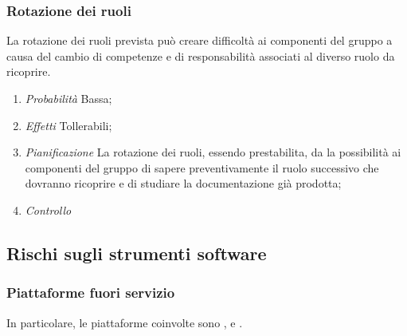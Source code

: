 		\subsubsection{Rotazione dei ruoli}

La rotazione dei ruoli prevista può creare difficoltà ai componenti del gruppo a causa del cambio di competenze e di responsabilità associati al diverso ruolo da ricoprire.

\begin{enumerate}
\item \textit{Probabilità} Bassa;
\item \textit{Effetti} Tollerabili;
\item \textit{Pianificazione} La rotazione dei ruoli, essendo prestabilita, da la possibilità ai componenti del gruppo di sapere preventivamente il ruolo successivo che dovranno ricoprire e di studiare la documentazione già prodotta;
\item \textit{Controllo} %
\end{enumerate}
	
	\subsection{Rischi sugli strumenti software}
	
		\subsubsection{Piattaforme fuori servizio}	

In particolare, le piattaforme coinvolte sono ,  e . 

